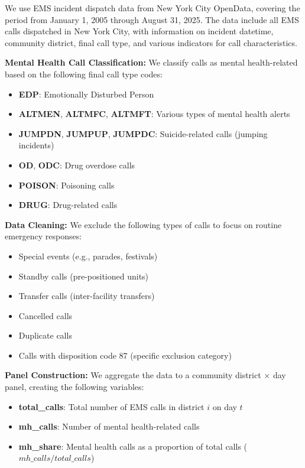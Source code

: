 \documentclass[11pt,a4paper]{article}
\begin{document}
We use EMS incident dispatch data from New York City OpenData, covering the period from January 1, 2005 through August 31, 2025. The data include all EMS calls dispatched in New York City, with information on incident datetime, community district, final call type, and various indicators for call characteristics.

\textbf{Mental Health Call Classification:} We classify calls as mental health-related based on the following final call type codes:
\begin{itemize}
    \item \textbf{EDP}: Emotionally Disturbed Person
    \item \textbf{ALTMEN}, \textbf{ALTMFC}, \textbf{ALTMFT}: Various types of mental health alerts
    \item \textbf{JUMPDN}, \textbf{JUMPUP}, \textbf{JUMPDC}: Suicide-related calls (jumping incidents)
    \item \textbf{OD}, \textbf{ODC}: Drug overdose calls
    \item \textbf{POISON}: Poisoning calls
    \item \textbf{DRUG}: Drug-related calls
\end{itemize}

\textbf{Data Cleaning:} We exclude the following types of calls to focus on routine emergency responses:
\begin{itemize}
    \item Special events (e.g., parades, festivals)
    \item Standby calls (pre-positioned units)
    \item Transfer calls (inter-facility transfers)
    \item Cancelled calls
    \item Duplicate calls
    \item Calls with disposition code 87 (specific exclusion category)
\end{itemize}

\textbf{Panel Construction:} We aggregate the data to a community district × day panel, creating the following variables:
\begin{itemize}
    \item \textbf{total\_calls}: Total number of EMS calls in district $i$ on day $t$
    \item \textbf{mh\_calls}: Number of mental health-related calls
    \item \textbf{mh\_share}: Mental health calls as a proportion of total calls ($mh\_calls / total\_calls$)
\end{itemize}
\end{document}
